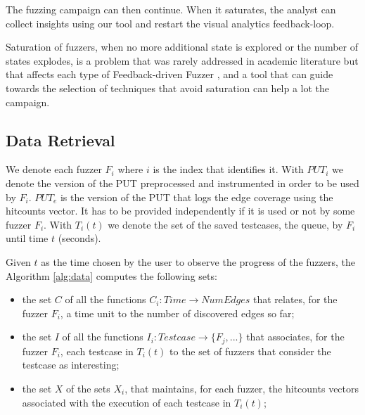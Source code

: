 \documentclass[conference,compsoc]{IEEEtran}
\begin{document}
The fuzzing campaign can then continue. When it saturates, the analyst can collect insights using our tool and restart the visual analytics feedback-loop.

Saturation of fuzzers, when no more additional state is explored or the number of states explodes, is a problem that was rarely addressed in academic literature but that affects each type of Feedback-driven Fuzzer \cite{saturation},  and a tool that can guide towards the selection of techniques that avoid saturation can help a lot the campaign.

\subsection{Data Retrieval}


We denote each fuzzer $F_i$ where $i$ is the index that identifies it. 
With $PUT_i$ we denote the version of the PUT preprocessed and instrumented in order to be used by $F_i$.
$PUT_e$ is the version of the PUT that logs the edge coverage using the hitcounts vector. It has to be provided independently if it is used or not by some fuzzer $F_i$.
With $T_i(t)$ we denote the set of the saved testcases, the queue, by $F_i$ until time $t$ (seconds).

Given $t$ as the time chosen by the user to observe the progress of the fuzzers, the Algorithm \ref{alg:data} computes the following sets:

\begin{itemize}
\item the set $C$ of all the functions $C_i \colon Time \longrightarrow NumEdges$ that relates, for the fuzzer $F_i$, a time unit to the number of discovered edges so far;
\item the set $I$ of all the functions $I_i \colon Testcase \longrightarrow \{F_j, ...\}$ that associates, for the fuzzer $F_i$, each testcase in $T_i(t)$ to the set of fuzzers that consider the testcase as interesting;
\item the set $X$ of the sets $X_i$, that maintains, for each fuzzer, the hitcounts vectors associated with the execution of each testcase in $T_i(t)$;
\end{itemize}
\end{document}
